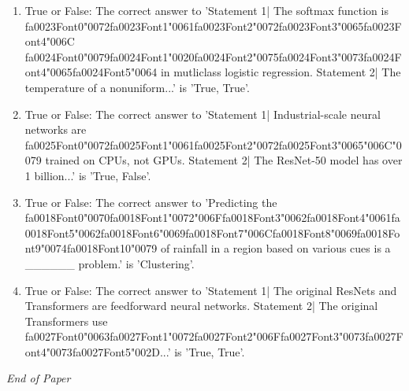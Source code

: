 \documentclass[12pt]{article}
\begin{document}
\begin{enumerate}[label=\arabic*.]
\item True or False: The correct answer to 'Statement 1| The softmax function is {\csname fa0023Font0\endcsname\char"0072}{\csname fa0023Font1\endcsname\char"0061}{\csname fa0023Font2\endcsname\char"0072}{\csname fa0023Font3\endcsname\char"0065}{\csname fa0023Font4\endcsname\char"006C} {\csname fa0024Font0\endcsname\char"0079}{\csname fa0024Font1\endcsname\char"0020}{\csname fa0024Font2\endcsname\char"0075}{\csname fa0024Font3\endcsname\char"0073}{\csname fa0024Font4\endcsname\char"0065}{\csname fa0024Font5\endcsname\char"0064} in mutliclass logistic regression. Statement 2| The temperature of a nonuniform...' is 'True, True'.
\item True or False: The correct answer to 'Statement 1| Industrial-scale neural networks are {\csname fa0025Font0\endcsname\char"0072}{\csname fa0025Font1\endcsname\char"0061}{\csname fa0025Font2\endcsname\char"0072}{\csname fa0025Font3\endcsname\char"0065}{\char"006C}{\char"0079} trained on CPUs, not GPUs. Statement 2| The ResNet-50 model has over 1 billion...' is 'True, False'.
\item True or False: The correct answer to 'Predicting the {\csname fa0018Font0\endcsname\char"0070}{\csname fa0018Font1\endcsname\char"0072}{\char"006F}{\csname fa0018Font3\endcsname\char"0062}{\csname fa0018Font4\endcsname\char"0061}{\csname fa0018Font5\endcsname\char"0062}{\csname fa0018Font6\endcsname\char"0069}{\csname fa0018Font7\endcsname\char"006C}{\csname fa0018Font8\endcsname\char"0069}{\csname fa0018Font9\endcsname\char"0074}{\csname fa0018Font10\endcsname\char"0079} of rainfall in a region based on various cues is a \_\_\_\_\_\_ problem.' is 'Clustering'.
\item True or False: The correct answer to 'Statement 1| The original ResNets and Transformers are feedforward neural networks. Statement 2| The original Transformers use {\csname fa0027Font0\endcsname\char"0063}{\csname fa0027Font1\endcsname\char"0072}{\csname fa0027Font2\endcsname\char"006F}{\csname fa0027Font3\endcsname\char"0073}{\csname fa0027Font4\endcsname\char"0073}{\csname fa0027Font5\endcsname\char"002D}...' is 'True, True'.
\end{enumerate}

\vfill
\noindent\textit{End of Paper}
\end{document}
